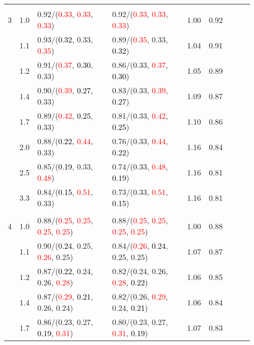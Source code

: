 \documentclass[10pt,a4paper]{report}
\begin{document}
\begin{table}[!htbp]
\begin{center}
{\begin{tabular}{ccllccccc}
			&&&&\\
			3			&1.0&0.92/(\textcolor{red}{0.33}, \textcolor{red}{0.33}, \textcolor{red}{0.33})&0.92/(\textcolor{red}{0.33}, \textcolor{red}{0.33}, \textcolor{red}{0.33})&1.00&0.92\\
			&1.1&0.93/(\textcolor{black}{0.32}, 0.33, \textcolor{red}{0.35})&0.89/(\textcolor{red}{0.35}, 0.33, \textcolor{black}{0.32})&1.04&0.91\\
			&1.2&0.91/(\textcolor{red}{0.37}, \textcolor{black}{0.30}, 0.33)&0.86/(0.33, \textcolor{red}{0.37}, \textcolor{black}{0.30})&1.05&0.89\\
			&1.4&0.90/(\textcolor{red}{0.39}, \textcolor{black}{0.27}, 0.33)&0.83/(0.33, \textcolor{red}{0.39}, \textcolor{black}{0.27})&1.09&0.87\\
			&1.7&0.89/(\textcolor{red}{0.42}, \textcolor{black}{0.25}, 0.33)&0.81/(0.33, \textcolor{red}{0.42}, \textcolor{black}{0.25})&1.10&0.86\\
			&2.0&0.88/(\textcolor{black}{0.22}, \textcolor{red}{0.44}, 0.33)&0.76/(0.33, \textcolor{red}{0.44}, \textcolor{black}{0.22})&1.16&0.84\\
			&2.5&0.85/(\textcolor{black}{0.19}, 0.33, \textcolor{red}{0.48})&0.74/(0.33, \textcolor{red}{0.48}, \textcolor{black}{0.19})&1.16&0.81\\
			&3.3&0.84/(\textcolor{black}{0.15}, \textcolor{red}{0.51}, 0.33)&0.73/(0.33, \textcolor{red}{0.51}, \textcolor{black}{0.15})&1.16&0.81\\
			&&&&\\
			4			&1.0&0.88/(\textcolor{red}{0.25}, \textcolor{red}{0.25}, \textcolor{red}{0.25}, \textcolor{red}{0.25})&0.88/(\textcolor{red}{0.25}, \textcolor{red}{0.25}, \textcolor{red}{0.25}, \textcolor{red}{0.25})&1.00&0.88\\
			&1.1&0.90/(\textcolor{black}{0.24}, 0.25, \textcolor{red}{0.26}, 0.25)&0.84/(\textcolor{red}{0.26}, \textcolor{black}{0.24}, 0.25, 0.25)&1.07&0.87\\
			&1.2&0.87/(\textcolor{black}{0.22}, 0.24, 0.26, \textcolor{red}{0.28})&0.82/(0.24, 0.26, \textcolor{red}{0.28}, \textcolor{black}{0.22})&1.06&0.85\\
			&1.4&0.87/(\textcolor{red}{0.29}, \textcolor{black}{0.21}, 0.26, 0.24)&0.82/(0.26, \textcolor{red}{0.29}, 0.24, \textcolor{black}{0.21})&1.06&0.84\\
			&1.7&0.86/(0.23, 0.27, \textcolor{black}{0.19}, \textcolor{red}{0.31})&0.80/(0.23, 0.27, \textcolor{red}{0.31}, \textcolor{black}{0.19})&1.07&0.83\\

\end{tabular}}
\end{center}
\end{table}
\end{document}

